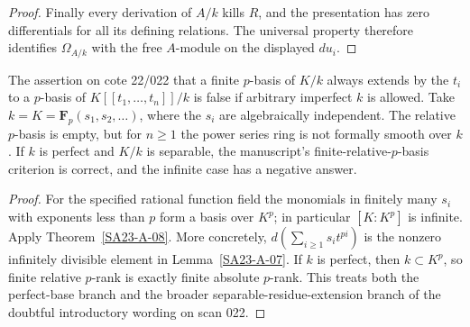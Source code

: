 \begin{proof}
Finally every derivation of $A/k$ kills $R$, and the presentation
has zero differentials for all its defining relations.  The
universal property therefore identifies $\Omega_{A/k}$ with the
free $A$-module on the displayed $du_i$.
\end{proof}

\begin{corollary}\label{SA23-A-09}
The assertion on cote 22/022 that a finite $p$-basis of $K/k$ always
extends by the $t_i$ to a $p$-basis of $K[[t_1,\ldots,t_n]]/k$
is false if arbitrary imperfect $k$ is allowed.  Take
$k=K=\mathbf F_p(s_1,s_2,\ldots)$, where the $s_i$ are algebraically
independent.  The relative $p$-basis is empty, but for $n\geq1$
the power series ring is not formally smooth over $k$.
If $k$ is perfect and $K/k$ is separable, the manuscript's
finite-relative-$p$-basis criterion is correct, and the infinite
case has a negative answer.
\end{corollary}
\begin{proof}
For the specified rational function field the monomials in finitely
many $s_i$ with exponents less than $p$ form a basis over $K^p$;
in particular $[K:K^p]$ is infinite.  Apply
Theorem~\ref{SA23-A-08}.  More concretely,
$d(\sum_{i\geq1}s_it^{pi})$ is the nonzero infinitely divisible
element in Lemma~\ref{SA23-A-07}.  If $k$ is perfect, then
$k\subset K^p$, so finite relative $p$-rank is exactly finite
absolute $p$-rank.  This treats both the perfect-base branch and
the broader separable-residue-extension branch of the doubtful
introductory wording on scan 022.
\end{proof}
